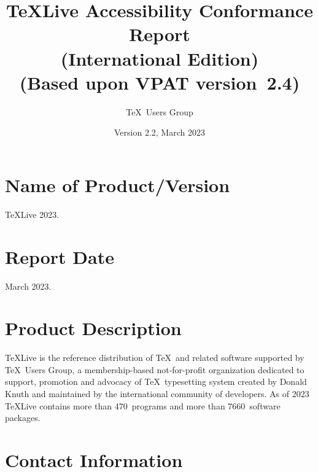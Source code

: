 \documentclass[titlepage]{article}
\begin{document}
\title{\TeX Live Accessibility Conformance Report\\
  (International Edition)\\
(Based upon VPAT\textsuperscript{\textregistered} version~2.4)}
\author{\TeX\ Users Group}
\date{Version 2.2, March 2023}

\hypersetup{
  pdftitle=TeX Live Accessibility Conformance Report,
  pdfauthor=TeX Users Group}
  
\maketitle

\newpage
{} 
\tableofcontents 

\newpage

\section{Name of Product/Version}
\label{sec:name}

\TeX Live 2023.


\section{Report Date}
\label{sec:date}

March 2023.


\section{Product Description}
\label{sec:description}

\TeX Live is the reference distribution of \TeX\ and related software
supported by \TeX\ Users Group, a membership-based not-for-profit
organization dedicated to support, promotion and advocacy of \TeX\
typesetting system created by Donald Knuth and maintained by the
international community of developers.  As of 2023 \TeX Live contains
more than 470~programs and more than 7660~software packages.

\section{Contact Information}
\label{sec:contact_info}
\end{document}
